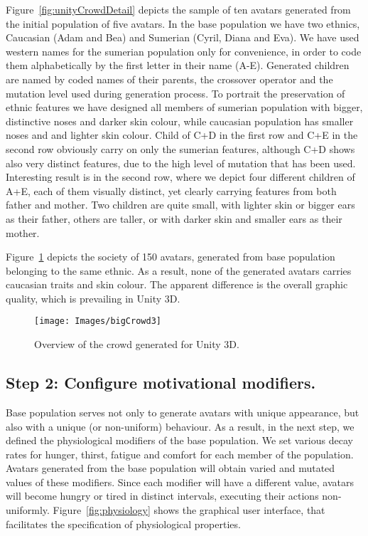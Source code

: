 \documentclass[graybox]{svmult}
\begin{document}
Figure~\ref{fig:unityCrowdDetail} depicts the sample of ten avatars generated from the initial population of five avatars. In the base population we have two ethnics, Caucasian (Adam and Bea) and Sumerian (Cyril, Diana and Eva). We have used western names for the sumerian population only for convenience, in order to code them alphabetically by the first letter in their name (A-E). Generated children are named by coded names of their parents, the crossover operator and the mutation level used during generation process. To portrait the preservation of ethnic features we have designed all members of sumerian population with bigger, distinctive noses and darker skin colour, while caucasian population has smaller noses and and lighter skin colour. Child of C+D in the first row and C+E in the second row obviously carry on only the sumerian features, although C+D shows also very distinct features, due to the high level of mutation that has been used. Interesting result is in the second row, where we depict four different children of A+E, each of them visually distinct, yet clearly carrying features from both father and mother. Two children are quite small, with lighter skin or bigger ears as their father, others are taller, or with darker skin and smaller ears as their mother.

Figure~\ref{fig:unityCrowdOverview} depicts the society of 150 avatars, generated from base population belonging to the same ethnic. As a result, none of the generated avatars carries caucasian traits and skin colour. The apparent difference is the overall graphic quality, which is prevailing in Unity 3D.


\begin{figure}[!ht]
    \texttt{[image: Images/bigCrowd3]}
    \caption{Overview of the crowd generated for Unity 3D.}
    \label{fig:unityCrowdOverview}
\end{figure}%

\subsection{Step 2: Configure motivational modifiers.}

Base population serves not only to generate avatars with unique appearance, but also with a unique (or non-uniform) behaviour. As a result, in the next step, we defined the physiological modifiers of the base population. We set various decay rates for hunger, thirst, fatigue and comfort for each member of the population. Avatars generated from the base population will obtain varied and mutated values of these modifiers. Since each modifier will have a different value, avatars will become hungry or tired in distinct intervals, executing their actions non-uniformly. Figure~\ref{fig:physiology} shows the graphical user interface, that facilitates the specification of physiological properties.  
\end{document}
